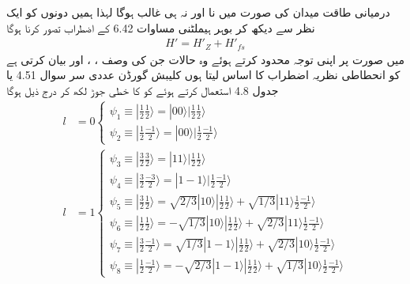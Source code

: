 درمیانی طاقت میدان کی صورت میں نا  اور نہ ہی  غالب ہوگا لہذا ہمیں دونوں کو ایک نظر سے دیکھ کر بوہر ہیملٹنی مساوات 6.42 کے اضطراب تصور کرنا ہوگا 
\begin{align}
H' = H'_Z + H'_{fs}
\end{align}
میں  صورت پر اپنی توجہ محدود کرتے ہوئے وہ حالات جن کی وصف ، ، اور  بیان کرتی ہے کو انحطاطی نظریہ اضطراب کا اساس لیتا ہوں كليبش گورڈن عددی سر سوال 4.51 یا جدول 4.8 استعمال کرتے ہوئے  کو  کا خطی جوڑ لکھ کر درج ذیل ہوگا 
\begin{align*}
l &= 0
\begin{cases}
\psi_1 \equiv | \frac{1}{2} \frac{1}{2} \rangle = | 00 \rangle | \frac{1}{2} \frac{1}{2} \rangle \\
\psi_2 \equiv | \frac{1}{2} \frac{-1}{2} \rangle = | 00 \rangle | \frac{1}{2} \frac{-1}{2} \rangle
\end{cases} \\
l &= 1
\begin{cases}
\psi_3 \equiv | \frac{3}{2} \frac{3}{2} \rangle = | 11 \rangle | \frac{1}{2} \frac{1}{2} \rangle \\
\psi_4 \equiv | \frac{3}{2} \frac{-3}{2} \rangle = | 1 - 1 \rangle | \frac{1}{2} \frac{-1}{2} \rangle \\
\psi_5 \equiv | \frac{3}{2} \frac{1}{2} \rangle = \sqrt{2/3}| 10 \rangle | \frac{1}{2} \frac{1}{2} \rangle + \sqrt{1/3} | 11 \rangle \frac{1}{2} \frac{-1}{2} \rangle \\
\psi_6 \equiv | \frac{1}{2} \frac{1}{2} \rangle = - \sqrt{1/3} | 10 \rangle | \frac{1}{2} \frac{1}{2} \rangle + \sqrt{2/3} | 11 \rangle \frac{1}{2} \frac{-1}{2} \rangle \\
\psi_7 \equiv | \frac{3}{2} \frac{-1}{2} \rangle = \sqrt{1/3} | 1 - 1 \rangle | \frac{1}{2} \frac{1}{2} \rangle + \sqrt{2/3} | 10 \rangle \frac{1}{2} \frac{-1}{2} \rangle \\
\psi_8 \equiv | \frac{1}{2} \frac{-1}{2} \rangle = - \sqrt{2/3} | 1 - 1 \rangle | \frac{1}{2} \frac{1}{2} \rangle + \sqrt{1/3} | 10 \rangle \frac{1}{2} \frac{-1}{2} \rangle
\end{cases}
\end{align*}

